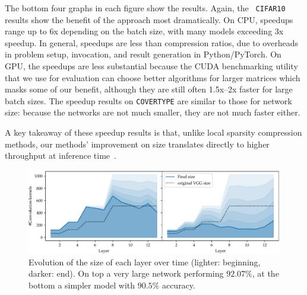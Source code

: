 The bottom four graphs in each figure show the results.  Again, the {\tt
CIFAR10} results show the benefit of the \shrink approach most dramatically.  On
CPU, speedups range up to 6x depending on the batch size, with many models
exceeding 3x speedup. In general, speedups are less than compression ratios, due
to overheads in problem setup, invocation, and result generation  in
Python/PyTorch.  On GPU, the speedups are less substantial because the CUDA
benchmarking utility that we use for evaluation can choose better algorithms for
larger matrices which masks some of our benefit, although they are still often
1.5x--2x faster for large batch sizes.  The speedup results on {\tt COVERTYPE}
are similar to those for network size:  because the networks are not much
smaller, they are not much faster either.

A key takeaway of these speedup results is that, unlike local sparsity
compression methods, our methods' improvement on size translates directly to
higher throughput at inference time~\cite{Han2015}.

\begin{figure}[htb]
\begin{center}
\vspace{-.1in}
\includegraphics[width=1\columnwidth]{size_evolution}
\vspace*{-5mm} 
\caption{ Evolution of the size of
  each layer over time (lighter: beginning, darker: end). On top a very large
  network performing $92.07\%$, at the bottom a simpler model with $90.5\%$
  accuracy. 
} 
\label{fig:network_size_evolution}
\end{center}
\vspace*{-4mm}
\end{figure}

